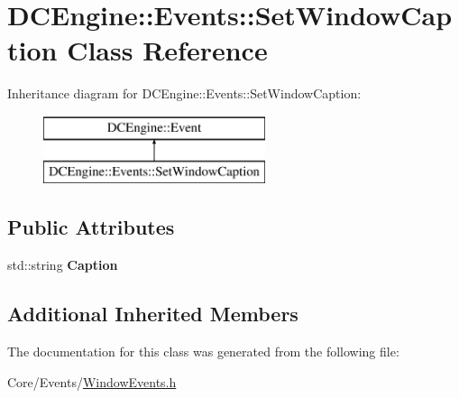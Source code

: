 \hypertarget{classDCEngine_1_1Events_1_1SetWindowCaption}{\section{D\-C\-Engine\-:\-:Events\-:\-:Set\-Window\-Caption Class Reference}
\label{classDCEngine_1_1Events_1_1SetWindowCaption}
}
Inheritance diagram for D\-C\-Engine\-:\-:Events\-:\-:Set\-Window\-Caption\-:\begin{figure}[H]
\begin{center}
\leavevmode
\includegraphics[height=2.000000cm]{classDCEngine_1_1Events_1_1SetWindowCaption}
\end{center}
\end{figure}
\subsection*{Public Attributes}
\begin{DoxyCompactItemize}
\item 
\hypertarget{classDCEngine_1_1Events_1_1SetWindowCaption_a7ba60c6ec5490c5734ef7d625b1222ba}{std\-::string {\bfseries Caption}}\label{classDCEngine_1_1Events_1_1SetWindowCaption_a7ba60c6ec5490c5734ef7d625b1222ba}

\end{DoxyCompactItemize}
\subsection*{Additional Inherited Members}


The documentation for this class was generated from the following file\-:\begin{DoxyCompactItemize}
\item 
Core/\-Events/\hyperlink{WindowEvents_8h}{Window\-Events.\-h}\end{DoxyCompactItemize}
